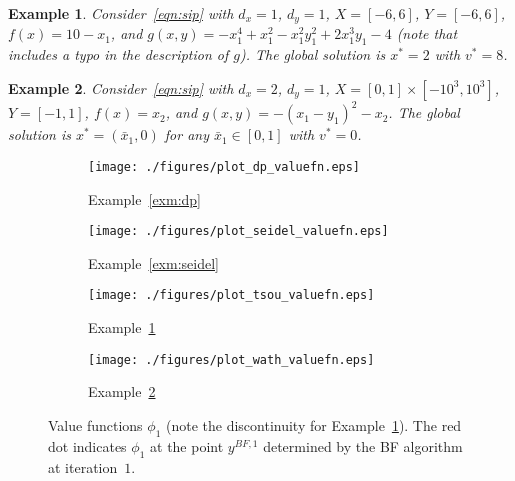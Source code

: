 \documentclass{article}
\newcommand{\1}[1]{\mathds{1}\left[#1\right]}
\newtheorem{example}{Example}
\begin{document}
\begin{example}{\citep[Ex.\ 2.1]{tsoukalas2011feasible}}
\label{exm:tsou}
Consider~\eqref{eqn:sip} with $d_x = 1$, $d_y = 1$, $X = [-6,6]$, $Y = [-6,6]$, $f(x) = 10 - x_1$, and $g(x,y) = -x^4_1 + x^2_1 - x^2_1y^2_1 + 2x^3_1y_1 - 4$ (note that~\citep[Ex.\ 2.1]{tsoukalas2011feasible} includes a typo in the description of $g$).
The global solution is $x^* = 2$ with $v^* = 8$.
\end{example}


\begin{example}{\citep[Ex.\ (H)]{mitsos2009test}}
\label{exm:wath}
Consider~\eqref{eqn:sip} with $d_x = 2$, $d_y = 1$, $X = [0,1] \times [-10^3, 10^3]$, $Y = [-1,1]$, $f(x) = x_2$, and $g(x,y) = -(x_1 - y_1)^2 - x_2$.
The global solution is $x^* = (\bar{x}_1, 0)$ for any $\bar{x}_1 \in [0,1]$ with $v^* = 0$.
\end{example}




\begin{figure}[t]
\centering
\begin{subfigure}{0.245\textwidth}
\texttt{[image: ./figures/plot\_dp\_valuefn.eps]}
    \caption{Example~\ref{exm:dp}}
\end{subfigure}%
\begin{subfigure}{0.245\textwidth}
\texttt{[image: ./figures/plot\_seidel\_valuefn.eps]}
\caption{Example~\ref{exm:seidel}}
\end{subfigure}%
\begin{subfigure}{0.245\textwidth}
\texttt{[image: ./figures/plot\_tsou\_valuefn.eps]}
    \caption{Example~\ref{exm:tsou}}
\end{subfigure}%
\begin{subfigure}{0.245\textwidth}
\texttt{[image: ./figures/plot\_wath\_valuefn.eps]}
    \caption{Example~\ref{exm:wath}}
\end{subfigure}
\caption{Value functions $\phi_1$ (note the discontinuity for Example~\ref{exm:tsou}). The red dot indicates $\phi_1$ at the point $y^{BF,1}$ determined by the BF algorithm at iteration~$1$.}
\label{fig:value-funcs}
\end{figure}
\end{document}
